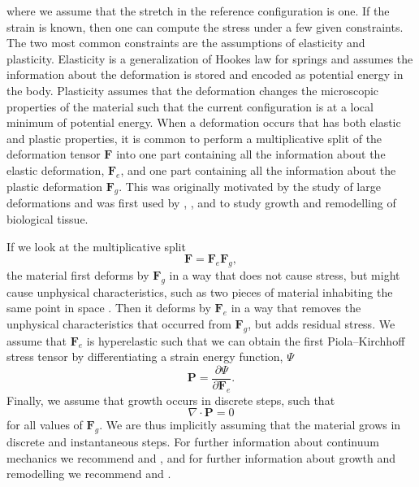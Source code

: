 where we assume that the stretch in the reference configuration is one. If the strain is known, then one can compute the stress under a few given constraints. The two most common constraints are the assumptions of elasticity and plasticity. Elasticity is a generalization of Hookes law for springs and assumes the information about the deformation is stored and encoded as potential energy in the body. Plasticity assumes that the deformation changes the microscopic properties of the material such that the current configuration is at a local minimum of potential energy. When a deformation occurs that has both elastic and plastic properties, it is common to perform a multiplicative split of the deformation tensor $\mathbf{F}$ into one part containing all the information about the elastic deformation, $\mathbf{F}_e$, and one part containing all the information about the plastic deformation $\mathbf{F}_g$. This was originally motivated by the study of large deformations and was first used by \citep{Kondaurov1987}, \citep{Takamizawa1990}, and \citep{Rodriguez1994} to study growth and remodelling of biological tissue. \par 
If we look at the multiplicative split
\begin{equation*}
    \mathbf{F} = \mathbf{F}_e\mathbf{F}_g,
\end{equation*}
the material first deforms by $\mathbf{F}_g$ in a way that does not cause stress, but might cause unphysical characteristics, such as two pieces of material inhabiting the same point in space . Then it deforms by $\mathbf{F}_e$ in a way that removes the unphysical characteristics that occurred from $\mathbf{F}_g$, but adds residual stress. We assume that $\mathbf{F}_e$ is hyperelastic such that we can obtain the first Piola–Kirchhoff stress tensor by differentiating a strain energy function, $\Psi$
\begin{equation*}
    \mathbf{P} = \frac{\partial\Psi}{\partial \mathbf{F}_e}.
\end{equation*}
Finally, we assume that growth occurs in discrete steps, such that 
\begin{equation*}
    \nabla\cdot\mathbf{P} = 0
\end{equation*}
for all values of $\mathbf{F}_g$. We are thus implicitly assuming that the material grows in discrete and instantaneous steps. For further information about continuum mechanics we recommend \citep{Marsden1983} and \citep{Holzapfel2002}, and for further information about growth and remodelling we recommend \citep{Goriely2017} and \citep{Yavari2010}.
